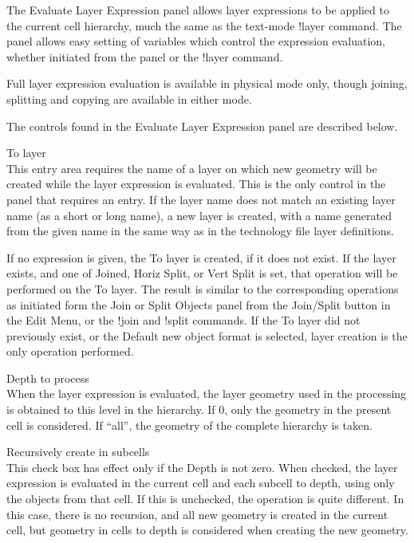 The {\cb Evaluate Layer Expression} panel allows layer expressions to
be applied to the current cell hierarchy, much the same as the
text-mode {\cb !layer} command.  The panel allows easy setting of
variables which control the expression evaluation, whether initiated
from the panel or the {\cb !layer} command.

Full layer expression evaluation is available in physical mode only,
though joining, splitting and copying are available in either mode.

The controls found in the {\cb Evaluate Layer Expression} panel are
described below.

\begin{description}
\item{\cb To layer}\\
This entry area requires the name of a layer on which new geometry
will be created while the layer expression is evaluated.  This is the
only control in the panel that requires an entry.  If the layer name
does not match an existing layer name (as a short or long name), a new
layer is created, with a name generated from the given name in the
same way as in the technology file layer definitions.

If no expression is given, the {\cb To layer} is created, if it does
not exist.  If the layer exists, and one of {\cb Joined}, {\cb Horiz
Split}, or {\cb Vert Split} is set, that operation will be performed
on the {\cb To layer}.  The result is similar to the corresponding
operations as initiated form the {\cb Join or Split Objects} panel
from the {\cb Join/Split} button in the {\cb Edit Menu}, or the {\cb !join}
and {\cb !split} commands.  If the {\cb To layer} did not previously
exist, or the {\cb Default} new object format is selected, layer
creation is the only operation performed.

\item{\cb Depth to process}\\
When the layer expression is evaluated, the layer geometry used in the
processing is obtained to this level in the hierarchy.  If 0, only the
geometry in the present cell is considered.  If ``{\vt all}'', the
geometry of the complete hierarchy is taken.

\item{\cb Recursively create in subcells}\\
This check box has effect only if the {\cb Depth} is not zero.  When
checked, the layer expression is evaluated in the current cell and
each subcell to depth, using only the objects from that cell.  If this
is unchecked, the operation is quite different.  In this case, there
is no recursion, and all new geometry is created in the current cell,
but geometry in cells to depth is considered when creating the new
geometry.


\end{description}
